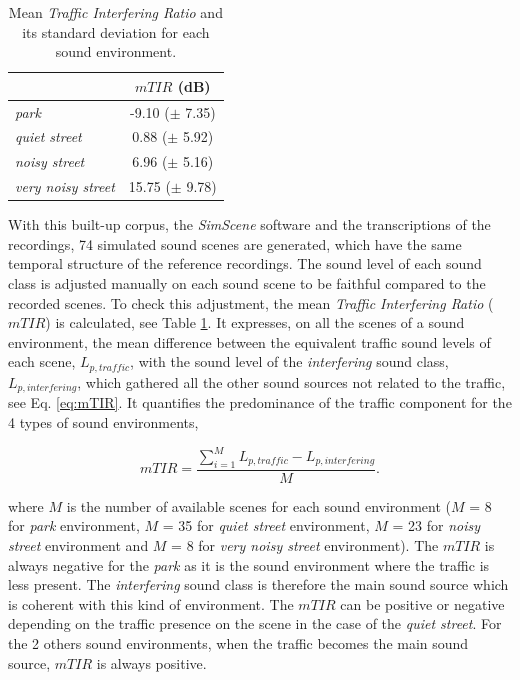 \documentclass[review,5p,twocolumn,sort&compress,times]{elsarticle}
\begin{document}
\begin{table}[t]
\centering
\caption{Mean \textit{Traffic Interfering Ratio} and its standard deviation for each sound environment.}
\begin{tabular}{lc}
 & $mTIR$ (dB)\\ \hline
 \textit{park} & -9.10 ($\pm$ 7.35) \\
 \textit{quiet street} & 0.88 ($\pm$ 5.92) \\
 \textit{noisy street} & 6.96 ($\pm$ 5.16) \\
 \textit{very noisy street} & 15.75 ($\pm$ 9.78) \\ \hline
\end{tabular}
\label{tab:mTIR}
\end{table}

With this built-up corpus, the \textit{SimScene} software and the transcriptions of the recordings, 74 simulated sound scenes are generated, which have the same temporal structure of the reference recordings. The sound level of each sound class is adjusted manually on each sound scene to be faithful compared to the recorded scenes. To check this adjustment, the mean \textit{Traffic Interfering Ratio} ($mTIR$) is calculated, see Table \ref{tab:mTIR}. It expresses, on all the scenes of a sound environment, the mean difference between the equivalent traffic sound levels of each scene, $L_{p,traffic}$, with the sound level of the \textit{interfering} sound class, $L_{p, interfering}$, which gathered all the other sound sources not related to the traffic, see Eq. \ref{eq:mTIR}. It quantifies the predominance of the traffic component for the 4 types of sound environments, 

\begin{equation}\label{eq:mTIR}
mTIR = \frac{\sum_{i = 1}^M L_{p,traffic} - L_{p, interfering}}{M}.
\end{equation}

where $M$ is the number of available scenes for each sound environment ($M$ = 8 for \textit{park} environment, $M$ = 35 for \textit{quiet street} environment, $M$ = 23 for \textit{noisy street} environment and $M$ = 8 for \textit{very noisy street} environment). The $mTIR$ is always negative for the \textit{park} as it is the sound environment where the traffic is less present. The \textit{interfering} sound class is therefore the main sound source which is coherent with this kind of environment. The $mTIR$ can be positive or negative depending on the traffic presence on the scene in the case of the \textit{quiet street}. For the 2 others sound environments, when the traffic becomes the main sound source, $mTIR$ is always positive.
\end{document}
